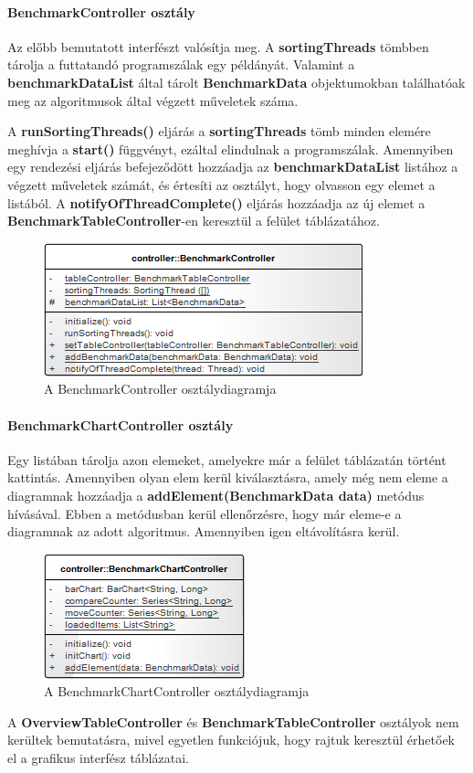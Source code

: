 \documentclass{elteikthesis}
\begin{document}
\paragraph{BenchmarkController osztály}
Az előbb bemutatott interfészt valósítja meg. A \textbf{sortingThreads} tömbben tárolja a futtatandó programszálak egy példányát. Valamint a \textbf{benchmarkDataList} által tárolt \textbf{BenchmarkData} objektumokban találhatóak meg az algoritmusok által végzett műveletek száma.\par
A \textbf{runSortingThreads()} eljárás a \textbf{sortingThreads} tömb minden elemére meghívja a \textbf{start()} függvényt, ezáltal elindulnak a programszálak.
Amennyiben egy rendezési eljárás befejeződött hozzáadja az \textbf{benchmarkDataList} listához a végzett műveletek számát, és értesíti az osztályt, hogy olvasson egy elemet a listából. A \textbf{notifyOfThreadComplete()} eljárás hozzáadja az új elemet a \textbf{BenchmarkTableController}-en keresztül a felület táblázatához.
\begin{figure}[H]
	\centering
	\includegraphics{pics/class/BenchmarkController.png}
	\caption{A BenchmarkController osztálydiagramja}
\end{figure}
\paragraph{BenchmarkChartController osztály}
Egy listában tárolja azon elemeket, amelyekre már a felület táblázatán történt kattintás. Amennyiben olyan elem kerül kiválasztásra, amely még nem eleme a diagramnak hozzáadja a \textbf{addElement(BenchmarkData data)} metódus hívásával. Ebben a metódusban kerül ellenőrzésre, hogy már eleme-e a diagramnak az adott algoritmus. Amennyiben igen eltávolításra kerül.
\begin{figure}[H]
	\centering
	\includegraphics{pics/class/BenchmarkChartController.png}
	\caption{A BenchmarkChartController osztálydiagramja}
\end{figure}
A \textbf{OverviewTableController} és \textbf{BenchmarkTableController} osztályok nem kerültek bemutatásra, mivel egyetlen funkciójuk, hogy rajtuk keresztül érhetőek el a grafikus interfész táblázatai.
\end{document}
